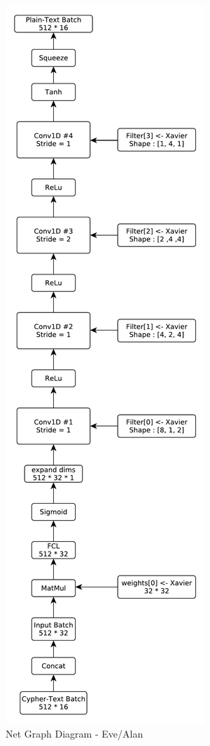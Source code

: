 \documentclass[12pt]{article}
\begin{document}
\newpage
\begin{figure}[!htbp]
	\begin{center}
		\includegraphics[height=0.93\textheight]{Eve-Diagram}
		\begin{center}
			\caption{ Net Graph Diagram - Eve/Alan}
		\end{center}
	\end{center}
\end{figure}
\end{document}
